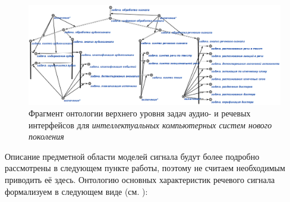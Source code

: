 \begin{figure}[H]
    \centerline{
        \includegraphics[scale=1.0, width=1.0\textwidth]{author/part4/figures/ch43_fig04_audio-and-speech-tasks-formalization-ru.png}
    }
    \caption{Фрагмент онтологии верхнего уровня задач аудио- и речевых интерфейсов для \textit{интеллектуальных компьютерных систем нового поколения}}
    \label{fig:audio-and-speech-tasks-formalization-ru}
\end{figure}

Описание предметной области моделей сигнала будут более подробно рассмотрены в следующем пункте работы, поэтому не считаем необходимым приводить её здесь.
Онтологию основных характеристик речевого сигнала формализуем в следующем виде (см. ):

